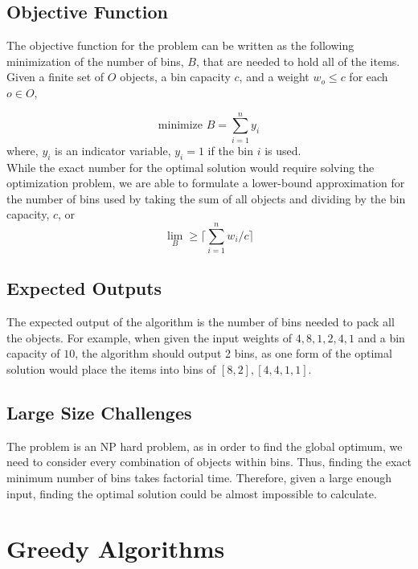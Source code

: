 \documentclass[11pt]{article}
\begin{document}
\subsection{Objective Function}
The objective function for the problem can be written as the following minimization of the number of
bins, ${B}$, that are needed to hold all of the items. Given a finite set of ${O}$ objects, a bin
capacity ${c}$, and a
weight ${w_o \leq c}$ for each ${o \in O}$,

\begin{equation}
	\text{minimize } B  = \sum_{i=1}^{n} y_i
\end{equation}
where, ${y_i}$ is an indicator variable, ${y_i = 1}$ if the bin ${i}$ is used. \\
While the exact number for the optimal solution would require solving the optimization problem, we
are able to formulate a lower-bound approximation for the number of bins used by taking the sum of
all objects and dividing by the bin capacity, ${c}$, or
\begin{equation}
	\lim_{B} \geq \lceil \sum_{i=1}^{n} w_i / c \rceil
\end{equation}
\subsection{Expected Outputs}
The expected output of the algorithm is the number of bins needed to pack all the objects.
For example, when given the input weights of ${{4, 8, 1, 2, 4, 1}}$ and a bin capacity of
${10}$,
the algorithm should output 2 bins, as one form of the optimal solution would place the items into bins of
${[8,2], [4,4,1,1]}$.

\subsection{Large Size Challenges}
The problem is an NP hard problem, as in order to find the global optimum, we need to consider
every combination of objects within bins. Thus, finding the exact minimum number of bins takes
factorial time. Therefore, given a large enough input, finding the optimal solution could be almost
impossible to calculate.

\section{Greedy Algorithms}
\end{document}
